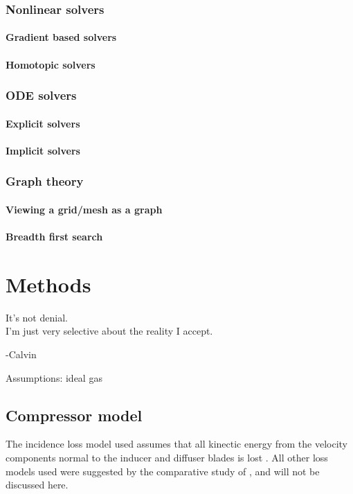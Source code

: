 \documentclass[tcc]{subfiles}
\begin{document}
\subsection{Nonlinear solvers}
\subsubsection{Gradient based solvers}
\subsubsection{Homotopic solvers}
\subsection{\ac{ODE} solvers}
\subsubsection{Explicit solvers}
\subsubsection{Implicit solvers}
\subsection{Graph theory}
\subsubsection{Viewing a grid/mesh as a graph}
\subsubsection{Breadth first search}


\chapter{Methods}
\label{sec:methods}
\epigraph{It's not denial. \\ I'm just very selective about the reality I accept.}{-Calvin}
Assumptions: ideal gas
\section{Compressor model}

The incidence loss model used assumes that all kinectic energy from the velocity components
normal to the inducer and diffuser blades is lost \cite{Stanitz1953}.
All other loss models used were suggested by the comparative study of \textcite{Oh1997}, 
and will not be discussed here.
\end{document}
